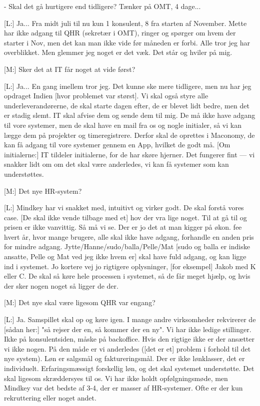 \begin{linenumbers*}
[M:] - Skal det gå hurtigere end tidligere? Tænker på OMT, 4 dage...

[L:] Ja... Fra midt juli til nu kun 1 konsulent, 8 fra starten af November. Mette har ikke adgang til QHR (sekretær i OMT), ringer og spørger om hvem der starter i Nov, men det kan man ikke vide før måneden er forbi. Alle tror jeg har overblikket. Men glemmer jeg noget er det væk. Det står og hviler på mig.

[M:] Sker det at IT får noget at vide først?

[L:] Ja... En gang imellem tror jeg. Det kunne ske mere tidligere, men nu har jeg opdraget Indien [hvor problemet var størst]. Vi skal også styre alle underleverandørerne, de skal starte dagen efter, de er blevet lidt bedre, men det er stadig slemt.  IT skal afvise dem og sende dem til mig. De må ikke have adgang til vore systemer, men de skal have en mail fra os og nogle initialer, så vi kan lægge dem på projekter og timeregistrere. Derfor skal de oprettes i Maconomy, de kan få adgang til vore systemer gennem en App, hvilket de godt må. [Om initialerne:] IT tildeler initialerne, for de har skøre hjerner. Det fungerer fint --- vi snakker lidt om om det skal være anderledes, vi kan få systemer som kan understøttes.

[M:] Det nye HR-system?

[L:] Mindkey har vi snakket med, intuitivt og virker godt. De skal forstå vores case. [De skal ikke vende tilbage med et] hov der vra lige noget. Til at gå til og prisen er ikke vanvittig. Så må vi se. Der er jo det at man kigger på økon. fee hvert år, hvor mange brugere, alle skal ikke have adgang, forhandle en anden pris for mindre adgang. Jytte/Hanne/sudo/balla/Pelle/Mat [sudo og balla er indiske ansatte, Pelle og Mat ved jeg ikke hvem er] skal have fuld adgang, og kan ligge ind i systemet. Jo kortere vej jo rigtigere oplysninger, [for eksempel] Jakob med K eller C. De skal så køre hele processen i systemet, så de får meget hjælp, og hvis der sker nogen noget så ligger de der.

[M:] Det nye skal være ligesom QHR var engang?

[L:] Ja. Samspillet skal op og køre igen. I mange andre virksomheder rekvirerer de [sådan her:] "så rejser der en, så kommer der en ny". Vi har ikke ledige stillinger. Ikke på konsulentsiden, måske på backoffice. Hvis den rigtige ikke er der ansætter vi ikke nogen. På den måde er vi anderledes ([det er et] problem i forhold til det nye system). Løn er salgsmål og faktureringsmål. Der er ikke lønklasser, det er individuelt. Erfaringsmæssigt forskellig løn, og det skal systemet understøtte. Det skal ligesom skræddersyes til os. Vi har ikke holdt opfølgningsmøde, men Mindkey var det bedste af 3-4, der er masser af HR-systemer. Ofte er der kun rekruttering eller noget andet.


\end{linenumbers*}
